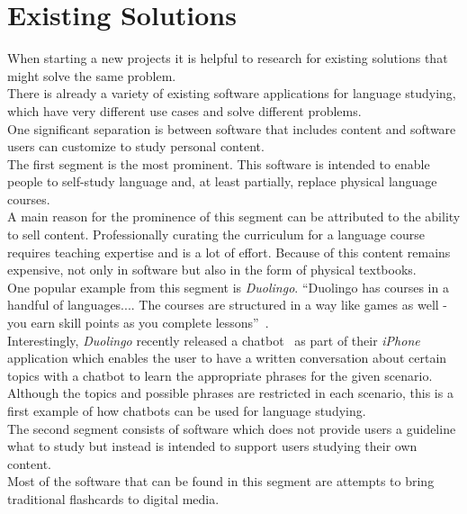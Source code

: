 \section{Existing Solutions}
\label{existing}


When starting a new projects it is helpful to research for existing solutions that might solve the same problem.
\\

There is already a variety of existing software applications for language studying, which have very different use cases and solve different problems.
\\

One significant separation is between software that includes content and software users can customize to study personal content.
\\

The first segment is the most prominent.
This software is intended to enable people to self-study language and, at least partially, replace physical language courses.
\\
A main reason for the prominence of this segment can be attributed to the ability to sell content.
Professionally curating the curriculum for a language course requires teaching expertise and is a lot of effort. Because of this content remains expensive, not only in software but also in the form of physical textbooks.
\\
One popular example from this segment is \emph{Duolingo}. ``Duolingo has courses in a handful of languages.... The courses are structured in a way like games as well - you earn skill points as you complete lessons''~\cite{lifehacker}.
\\
Interestingly, \emph{Duolingo} recently released a chatbot~\cite{topbots2} as part of their \emph{iPhone} application which enables the user to have a written conversation about certain topics with a chatbot to learn the appropriate phrases for the given scenario.
Although the topics and possible phrases are restricted in each scenario, this is a first example of how chatbots can be used for language studying.
\\

The second segment consists of software which does not provide users a guideline what to study but instead is intended to support users studying their own content.
\\
Most of the software that can be found in this segment are attempts to bring traditional flashcards to digital media.
\\

